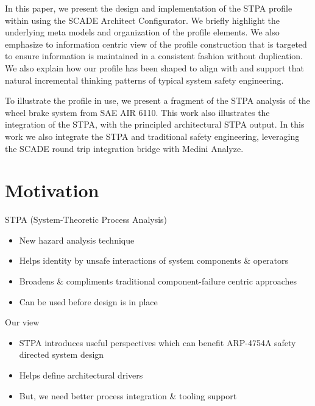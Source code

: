 \documentclass[conference]{IEEEtran}
\begin{document}
In this paper, we present the design and implementation of the STPA profile
within using the SCADE Architect Configurator. We briefly highlight the
underlying meta models and organization of the profile elements. We also
emphasize to information centric view of the profile construction that is
targeted to ensure information is maintained in a consistent fashion without
duplication. We also explain how our profile has been shaped to align with and
support that natural incremental thinking patterns of typical system safety
engineering.

To illustrate the profile in use, we present a fragment of the STPA analysis of
the wheel brake system from SAE AIR 6110. This work also illustrates the
integration of the STPA, with the principled architectural STPA output. In this
work we also integrate the STPA and traditional safety engineering, leveraging
the SCADE round trip integration bridge with Medini Analyze.

\section{Motivation}

STPA (System-Theoretic Process Analysis) 
\begin{itemize}
\item New hazard analysis technique 

\item Helps identity by unsafe interactions of system components \& operators

\item Broadens \& compliments traditional component-failure centric approaches

\item Can be used before design is in place 

\end{itemize}
Our view 
\begin{itemize}

\item STPA introduces useful perspectives which can benefit ARP-4754A safety directed system design

\item Helps define architectural drivers  

\item But, we need better process integration \& tooling support 
\end{itemize}
\end{document}
